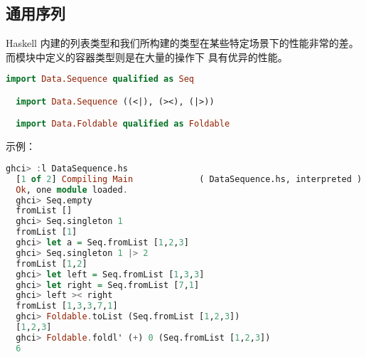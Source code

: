 \documentclass[./main.tex]{subfiles}
\begin{document}
\subsection*{通用序列}

Haskell 内建的列表类型和我们所构建的类型在某些特定场景下的性能非常的差。而模块中定义的容器类型则是在大量的操作下
具有优异的性能。

\begin{lstlisting}[language=Haskell]
  import Data.Sequence qualified as Seq

  import Data.Sequence ((<|), (><), (|>))

  import Data.Foldable qualified as Foldable
\end{lstlisting}

示例：

\begin{lstlisting}[language=Haskell]
  ghci> :l DataSequence.hs
  [1 of 2] Compiling Main             ( DataSequence.hs, interpreted )
  Ok, one module loaded.
  ghci> Seq.empty
  fromList []
  ghci> Seq.singleton 1
  fromList [1]
  ghci> let a = Seq.fromList [1,2,3]
  ghci> Seq.singleton 1 |> 2
  fromList [1,2]
  ghci> let left = Seq.fromList [1,3,3]
  ghci> let right = Seq.fromList [7,1]
  ghci> left >< right
  fromList [1,3,3,7,1]
  ghci> Foldable.toList (Seq.fromList [1,2,3])
  [1,2,3]
  ghci> Foldable.foldl' (+) 0 (Seq.fromList [1,2,3])
  6
\end{lstlisting}
\end{document}
